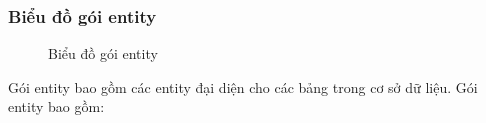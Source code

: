 \documentclass[../DoAn.tex]{subfiles}
\begin{document}
\subsubsection{Biểu đồ gói entity}

\begin{figure}[H]
    \centering
    \caption{Biểu đồ gói entity}
    \label{fig:Fig7}
\end{figure}
Gói entity bao gồm các entity đại diện cho các bảng trong cơ sở dữ liệu. Gói entity bao gồm:
\end{document}
